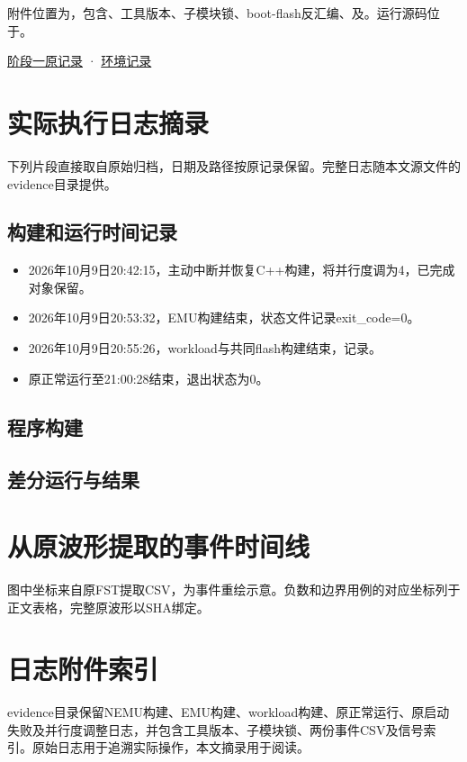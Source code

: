 附件位置为，包含、工具版本、子模块锁、boot-flash反汇编、及。运行源码位于。\par


\href{https://github.com/cc77-builder/riscv/blob/eca41d7cd959f5f3c4f240e382919c492d1ccb96/team/docs/stage1.md}{阶段一原记录} · \href{https://github.com/cc77-builder/riscv/blob/eca41d7cd959f5f3c4f240e382919c492d1ccb96/team/docs/environment.md}{环境记录}\par
\section{实际执行日志摘录}
下列片段直接取自原始归档，日期及路径按原记录保留。完整日志随本文源文件的evidence目录提供。
\subsection{构建和运行时间记录}
\begin{itemize}
\item 2026年10月9日20:42:15，主动中断并恢复C++构建，将并行度调为4，已完成对象保留。
\item 2026年10月9日20:53:32，EMU构建结束，状态文件记录exit\_code=0。
\item 2026年10月9日20:55:26，workload与共同flash构建结束，记录。
\item 原正常运行至21:00:28结束，退出状态为0。
\end{itemize}
\subsection{程序构建}
\subsection{差分运行与结果}
\section{从原波形提取的事件时间线}
\begin{center}
\end{center}
图中坐标来自原FST提取CSV，为事件重绘示意。负数和边界用例的对应坐标列于正文表格，完整原波形以SHA绑定。
\section{日志附件索引}
evidence目录保留NEMU构建、EMU构建、workload构建、原正常运行、原启动失败及并行度调整日志，并包含工具版本、子模块锁、两份事件CSV及信号索引。原始日志用于追溯实际操作，本文摘录用于阅读。
